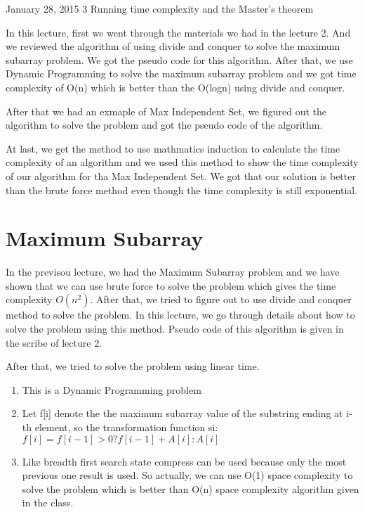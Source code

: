 \documentclass[usletter]{article}
\begin{document}
           {January 28, 2015}                          %
           {3}                                       %
           {Running time complexity and the Master's theorem}  %

\noindent
In this lecture, first we went through the materials we had in the lecture 2. And we reviewed the algorithm of using divide and conquer to solve the maximum subarray problem. We got the pseudo code for this algorithm. After that, we use Dynamic Programming to solve the maximum subarray problem and we got time complexity of O(n) which is better than the O(logn) using divide and conquer.

After that we had an exmaple of Max Independent Set, we figured out the algorithm to solve the problem and got the pseudo code of the algorithm.

At last, we get the method to use mathmatics induction to calculate the time complexity of an algorithm and we used this method to show the time complexity of our algorithm for tha Max Independent Set. We got that our solution is better than the brute force method even though the time complexity is still exponential.

\section{Maximum Subarray}
In the previsou lecture, we had the Maximum Subarray problem and we have shown that we can use brute force to solve the problem which gives the time complexity $O(n^2)$. After that, we tried to figure out to use divide and conquer method to solve the problem. In this lecture, we go through details about how to solve the problem using this method. Pseudo code of this algorithm is given in the scribe of lecture 2.

After that, we tried to solve the problem using linear time. 
\begin{enumerate}
	\item This is a Dynamic Programming problem
	\item Let f[i] denote the the maximum subarray value of the substring ending at i-th element, so the transformation function si: $f[i] = f[i-1]>0 ? f[i-1]+A[i] : A[i]$
	\item Like breadth first search state compress can be used because only the most previous one result is used. So actually, we can use O(1) space complexity to solve the problem which is better than O(n) space complexity algorithm given in the class.
\end{enumerate}
\end{document}
